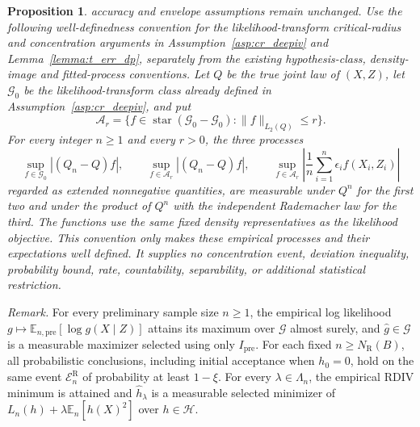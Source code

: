 \documentclass[12pt]{article}
\theoremstyle{plain}
\newtheorem{proposition}[theorem]{Proposition}
\theoremstyle{definition}
\theoremstyle{remark}
\begin{document}
\begin{proposition}
accuracy and envelope assumptions remain unchanged. Use the following well-definedness convention for the likelihood-transform critical-radius and concentration arguments in Assumption~\ref{asp:cr_deepiv} and Lemma~\ref{lemma:t_err_dp}, separately from the existing hypothesis-class, density-image and fitted-process conventions. Let $Q$ be the true joint law of $(X,Z)$, let $\mathcal G_0$ be the likelihood-transform class already defined in Assumption~\ref{asp:cr_deepiv}, and put \[ \mathcal A_r=\{f\in\operatorname{star}(\mathcal G_0-\mathcal G_0):\|f\|_{L_2(Q)}\leqslant r\}. \] For every integer $n\geqslant1$ and every $r>0$, the three processes \[ \sup_{f\in\mathcal G_0}|(Q_n-Q)f|,\qquad \sup_{f\in\mathcal A_r}|(Q_n-Q)f|,\qquad \sup_{f\in\mathcal A_r}\left|\frac1n\sum_{i=1}^n\epsilon_i f(X_i,Z_i)\right| \] regarded as extended nonnegative quantities, are measurable under $Q^n$ for the first two and under the product of $Q^n$ with the independent Rademacher law for the third. The functions use the same fixed density representatives as the likelihood objective. This convention only makes these empirical processes and their expectations well defined. It supplies no concentration event, deviation inequality, probability bound, rate, countability, separability, or additional statistical restriction.
\end{proposition}

\noindent\textit{Remark.} For every preliminary sample size $n\geqslant1$, the empirical log likelihood $g\mapsto\mathbb E_{n,\mathrm{pre}}[\log g(X\mid Z)]$ attains its maximum over $\mathcal G$ almost surely, and $\hat g\in\mathcal G$ is a measurable maximizer selected using only $I_{\mathrm{pre}}$. For each fixed $n\geqslant N_{\mathrm R}(B)$, all probabilistic conclusions, including initial acceptance when $h_0=0$, hold on the same event $\mathcal E_n^{\mathrm R}$ of probability at least $1-\xi$. For every $\lambda\in\Lambda_n$, the empirical RDIV minimum is attained and $\hat h_\lambda$ is a measurable selected minimizer of $L_n(h)+\lambda\mathbb E_n[h(X)^2]$ over $h\in\mathcal H$.
\end{document}
